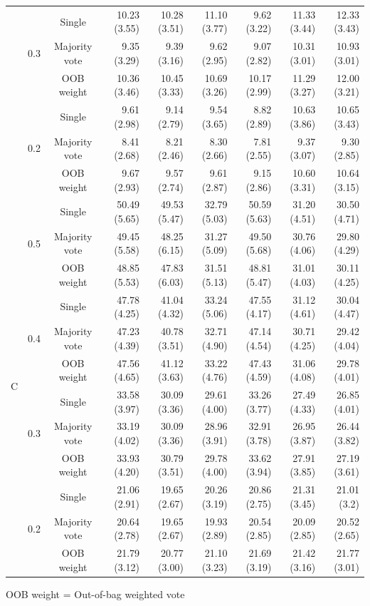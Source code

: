 \documentclass[eng]{csam}
\begin{document}
\begin{table}[ht]
\begin{tabular}{cccrrrrrr}
\cline{2-9}
&\multirow{3}{*}{0.3} & Single        & 10.23 (3.55) & 10.28 (3.51) & 11.10 (3.77) &  9.62 (3.22) & 11.33 (3.44) & 12.33 (3.43) \\
&      				  & Majority vote &  9.35 (3.29) &  9.39 (3.16) &  9.62 (2.95) &  9.07 (2.82) & 10.31 (3.01) & 10.93 (3.01) \\ 
&					  & OOB weight    & 10.36 (3.46) & 10.45 (3.33) & 10.69 (3.26) & 10.17 (2.99) & 11.29 (3.27) & 12.00 (3.21) \\ 
\cline{2-9}
&\multirow{3}{*}{0.2} & Single        & 9.61 (2.98) & 9.14 (2.79) & 9.54 (3.65) & 8.82 (2.89) & 10.63 (3.86) & 10.65 (3.43) \\ 
&					  & Majority vote & 8.41 (2.68) & 8.21 (2.46) & 8.30 (2.66) & 7.81 (2.55) &  9.37 (3.07) &  9.30 (2.85) \\ 
&					  & OOB weight    & 9.67 (2.93) & 9.57 (2.74) & 9.61 (2.87) & 9.15 (2.86) & 10.60 (3.31) & 10.64 (3.15) \\ 
\hline
\multirow{12}{*}{C} & \multirow{3}{*}{0.5} & Single        & 50.49 (5.65) & 49.53 (5.47) & 32.79 (5.03) & 50.59 (5.63) & 31.20 (4.51) & 30.50 (4.71) \\
&					  & Majority vote & 49.45 (5.58) & 48.25 (6.15) & 31.27 (5.09) & 49.50 (5.68) & 30.76 (4.06) & 29.80 (4.29) \\ 
&					  & OOB weight    & 48.85 (5.53) & 47.83 (6.03) & 31.51 (5.13) & 48.81 (5.47) & 31.01 (4.03) & 30.11 (4.25) \\ 
\cline{2-9}
& \multirow{3}{*}{0.4} & Single        & 47.78 (4.25) & 41.04 (4.32) & 33.24 (5.06) & 47.55 (4.17) & 31.12 (4.61) & 30.04 (4.47) \\ 
&					   & Majority vote & 47.23 (4.39) & 40.78 (3.51) & 32.71 (4.90) & 47.14 (4.54) & 30.71 (4.25) & 29.42 (4.04) \\
&					   & OOB weight    & 47.56 (4.65) & 41.12 (3.63) & 33.22 (4.76) & 47.43 (4.59) & 31.06 (4.08) & 29.78 (4.01) \\ 

\cline{2-9}
&\multirow{3}{*}{0.3} & Single        & 33.58 (3.97) & 30.09 (3.36) & 29.61 (4.00) & 33.26 (3.77) & 27.49 (4.33) & 26.85 (4.01) \\ 
&      				  & Majority vote & 33.19 (4.02) & 30.09 (3.36) & 28.96 (3.91) & 32.91 (3.78) & 26.95 (3.87) & 26.44 (3.82) \\ 
&					  & OOB weight    & 33.93 (4.20) & 30.79 (3.51) & 29.78 (4.00) & 33.62 (3.94) & 27.91 (3.85) & 27.19 (3.61) \\ 
\cline{2-9}
&\multirow{3}{*}{0.2} & Single        & 21.06 (2.91) & 19.65 (2.67) & 20.26 (3.19) & 20.86 (2.75) & 21.31 (3.45) & 21.01 (3.2) \\ 
&					  & Majority vote & 20.64 (2.78) & 19.65 (2.67) & 19.93 (2.89) & 20.54 (2.85) & 20.09 (2.85) & 20.52 (2.65) \\
&					  & OOB weight    & 21.79 (3.12) & 20.77 (3.00) & 21.10 (3.23) & 21.69 (3.19) & 21.42 (3.16) & 21.77 (3.01) \\
		\hline\hline
	\end{tabular}
	OOB weight = Out-of-bag weighted vote
\end{table}
\end{document}
